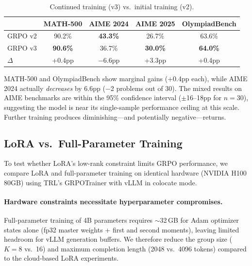\documentclass[11pt,a4paper]{article}
\begin{document}
\begin{table}[H]
\centering
\caption{Continued training (v3) vs.\ initial training (v2).}
\label{tab:v3-vs-v2}
\begin{tabular}{lcccc}
\toprule
& \textbf{MATH-500} & \textbf{AIME 2024} & \textbf{AIME 2025} & \textbf{OlympiadBench} \\
\midrule
GRPO v2 & 90.2\% & \textbf{43.3\%} & 26.7\% & 63.6\% \\
GRPO v3 & \textbf{90.6\%} & 36.7\% & \textbf{30.0\%} & \textbf{64.0\%} \\
\midrule
$\Delta$ & +0.4pp & $-$6.6pp & +3.3pp & +0.4pp \\
\bottomrule
\end{tabular}
\end{table}

MATH-500 and OlympiadBench show marginal gains (+0.4pp each), while AIME 2024 actually \emph{decreases} by 6.6pp ($-$2 problems out of 30). The mixed results on AIME benchmarks are within the 95\% confidence interval ($\pm$16--18pp for $n=30$), suggesting the model is near its single-sample performance ceiling at this scale. Further training produces diminishing---and potentially negative---returns.

\subsection{LoRA vs.\ Full-Parameter Training}
\label{sec:lora-vs-fullparam}

To test whether LoRA's low-rank constraint limits GRPO performance, we compare LoRA and full-parameter training on identical hardware (NVIDIA H100 80GB) using TRL's GRPOTrainer with vLLM in colocate mode.

\paragraph{Hardware constraints necessitate hyperparameter compromises.} Full-parameter training of 4B parameters requires $\sim$32\,GB for Adam optimizer states alone (fp32 master weights + first and second moments), leaving limited headroom for vLLM generation buffers. We therefore reduce the group size ($K=8$ vs.\ 16) and maximum completion length (2048 vs.\ 4096 tokens) compared to the cloud-based LoRA experiments.
\end{document}
